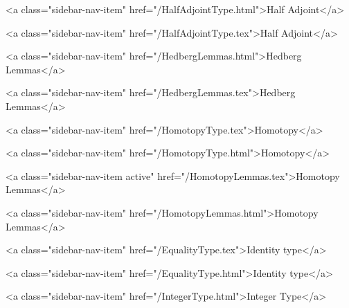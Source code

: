           <a class="sidebar-nav-item" href="/HalfAdjointType.html">Half Adjoint</a>
        
      
    
      
        
          <a class="sidebar-nav-item" href="/HalfAdjointType.tex">Half Adjoint</a>
        
      
    
      
        
          <a class="sidebar-nav-item" href="/HedbergLemmas.html">Hedberg Lemmas</a>
        
      
    
      
        
          <a class="sidebar-nav-item" href="/HedbergLemmas.tex">Hedberg Lemmas</a>
        
      
    
      
        
          <a class="sidebar-nav-item" href="/HomotopyType.tex">Homotopy</a>
        
      
    
      
        
          <a class="sidebar-nav-item" href="/HomotopyType.html">Homotopy</a>
        
      
    
      
        
          <a class="sidebar-nav-item active" href="/HomotopyLemmas.tex">Homotopy Lemmas</a>
        
      
    
      
        
          <a class="sidebar-nav-item" href="/HomotopyLemmas.html">Homotopy Lemmas</a>
        
      
    
      
        
          <a class="sidebar-nav-item" href="/EqualityType.tex">Identity type</a>
        
      
    
      
        
          <a class="sidebar-nav-item" href="/EqualityType.html">Identity type</a>
        
      
    
      
        
          <a class="sidebar-nav-item" href="/IntegerType.html">Integer Type</a>
        
      
    
      
        
